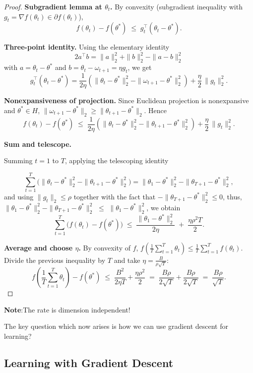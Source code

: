 \documentclass[11pt]{article}
\theoremstyle{plain}
\begin{document}
\begin{proof}
\textbf{Subgradient lemma at $\theta_t$.}
By convexity (subgradient inequality with $g_t=\nabla f(\theta_t)\in\partial f(\theta_t)$),
\[
f(\theta_t)-f(\theta^*) \;\le\; g_t^{\top}(\theta_t-\theta^*).
\]

\textbf{Three-point identity.}
Using the elementary identity
\[
2a^{\top}b=\|a\|_2^2+\|b\|_2^2-\|a-b\|_2^2
\]
with $a=\theta_t-\theta^*$ and $b=\theta_t-\omega_{t+1}=\eta g_t$, we get
\[
g_t^{\top}(\theta_t-\theta^*)
=\frac{1}{2\eta}\!\left(\|\theta_t-\theta^*\|_2^2-\|\omega_{t+1}-\theta^*\|_2^2\right)
+\frac{\eta}{2}\,\|g_t\|_2^2.
\]

\textbf{Nonexpansiveness of projection.}
Since Euclidean projection is nonexpansive and $\theta^*\in H$,
\(
\|\omega_{t+1}-\theta^*\|_2 \ge \|\theta_{t+1}-\theta^*\|_2.
\)
Hence
\[
f(\theta_t)-f(\theta^*) \;\le\;
\frac{1}{2\eta}\!\left(\|\theta_t-\theta^*\|_2^2-\|\theta_{t+1}-\theta^*\|_2^2\right)
+\frac{\eta}{2}\,\|g_t\|_2^2.
\]

\textbf{Sum and telescope.}

Summing $t=1$ to $T$, applying the telescoping identity 

\[
\sum_{t=1}^T \bigl(\|\theta_t-\theta^*\|_2^2 - \|\theta_{t+1}-\theta^*\|_2^2\bigr) 
= \|\theta_1-\theta^*\|_2^2 - \|\theta_{T+1}-\theta^*\|_2^2,
\] 
and using $\|g_t\|_2 \le \rho$ together with the fact that 
$-\|\theta_{T+1}-\theta^*\|_2^2 \le 0$, thus, $\|\theta_1-\theta^*\|_2^2 - \|\theta_{T+1}-\theta^*\|_2^2$ $\le$ $\|\theta_1-\theta^*\|_2^2$, we obtain
\[
\sum_{t=1}^T \bigl(f(\theta_t)-f(\theta^*)\bigr)
\;\le\; \frac{\|\theta_1-\theta^*\|_2^2}{2\eta} \;+\; \frac{\eta\rho^2 T}{2}.
\]


\textbf{Average and choose $\eta$.}
By convexity of $f$,
\(
f\!\left(\frac1T\sum_{t=1}^T\theta_t\right)\le \frac1T\sum_{t=1}^T f(\theta_t).
\)
Divide the previous inequality by $T$ and take
\(\eta=\frac{B}{\rho\sqrt{T}}\):
\[
f\!\left(\frac1T\sum_{t=1}^T\theta_t\right)-f(\theta^*)
\;\le\; \frac{B^2}{2\eta T}+\frac{\eta\rho^2}{2}
\;=\; \frac{B\rho}{2\sqrt{T}}+\frac{B\rho}{2\sqrt{T}}
\;=\; \frac{B\rho}{\sqrt{T}}.
\]
\end{proof}

\textbf{Note}:The rate is dimension independent!

The key question which now arises is how we can use gradient descent for learning?

\subsection{Learning with Gradient Descent}
\end{document}

